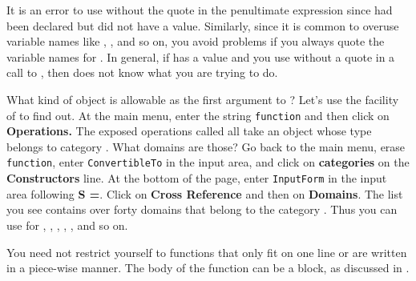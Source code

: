 It is an error to use  without the quote in the
penultimate expression since  had been declared but did not have
a value.
Similarly, since it is common to overuse variable names like ,
, and so on,
you avoid problems if you always quote the variable names
for .
In general,
if  has a value and you use  without a quote in a call to
, then
\Language{} does not know what you are trying to do.

What kind of object is allowable as the first argument to ?
Let's use the \Browse{} facility of \HyperName{} to find out.
At the main \Browse{} menu, enter the string {\tt function} and then
click on {\bf Operations.}
The exposed operations called  all take an object
whose type belongs to category .
What domains are those?
Go back to the main \Browse{} menu, erase {\tt function},
enter {\tt ConvertibleTo} in the
input area, and click on {\bf categories} on the {\bf Constructors} line.
At the bottom of the page, enter {\tt InputForm} in the input area
following {\bf S =}.
Click on {\bf Cross Reference} and then on {\bf Domains}.
The list you see contains over forty domains that belong to the
category .
Thus you can use  for ,
,
,
,
, and so on.


You need not restrict yourself to functions that only fit on one line
or are written in a piece-wise manner.
The body of the function can be a block, as discussed in
.

